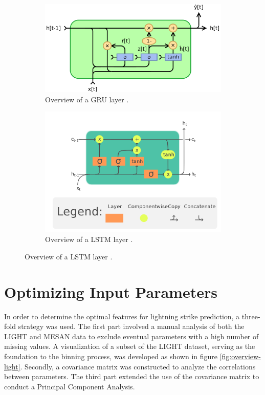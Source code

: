 \begin{figure}[h]
	\centering
	\begin{subfigure}[b]{0.45\linewidth}
		\includegraphics[width=\linewidth, keepaspectratio]{figures/overview-gru}
		\caption{Overview of a GRU layer \cite{fig-gru}.}
		\label{fig:overview-gru}
	\end{subfigure}
	\hfill
	\begin{subfigure}[b]{0.45\linewidth}
		\includegraphics[width=\linewidth, keepaspectratio]{figures/overview-lstm}
		\caption{Overview of a LSTM layer \cite{fig-lstm}.}
		\label{fig:overview-lstm}
	\end{subfigure}
\end{figure}

\section{Optimizing Input Parameters}
\label{sec:method-features}

In order to determine the optimal features for lightning strike prediction, a three-fold strategy was used. The first part involved a manual analysis of both the LIGHT and MESAN data to exclude eventual parameters with a high number of missing values. A visualization of a subset of the LIGHT dataset, serving as the foundation to the binning process, was developed as shown in figure \ref{fig:overview-light}. Secondly, a covariance matrix was constructed to analyze the correlations between parameters. The third part extended the use of the covariance matrix to conduct a Principal Component Analysis.


